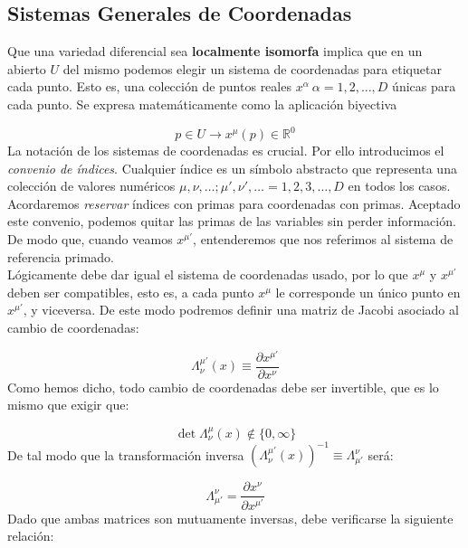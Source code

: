 \documentclass[12pt,a4paper]{book}
\numberwithin{equation}{section}
\numberwithin{figure}{section}
\newcommand{\parciales}[2]{\frac{\partial #1}{\partial #2}}
\begin{document}
\subsection{Sistemas Generales de Coordenadas}

Que una variedad diferencial sea \textbf{localmente isomorfa} implica que en un abierto $U$ del mismo podemos elegir un sistema de coordenadas para etiquetar cada punto. Esto es, una colección de puntos reales $x^{\alpha} \ \alpha=1,2,...,D$ únicas para cada punto. Se expresa matemáticamente como la aplicación biyectiva 

\begin{equation}
p \in U \longrightarrow x^{\mu} (p) \in \mathbb{R}^0
\end{equation}
La notación de los sistemas de coordenadas es crucial. Por ello introducimos el \textit{convenio de índices}. Cualquier índice es un símbolo abstracto que representa una colección de valores numéricos $\mu,\nu,\ldots;\mu',\nu',\ldots = 1,2,3,\ldots,D$ en todos los casos. Acordaremos \textit{reservar} índices con primas para coordenadas con primas. Aceptado este convenio, podemos quitar las primas de las variables sin perder información. De modo que, cuando veamos $x^{\mu'}$, entenderemos que nos referimos al sistema de referencia primado. \\

Lógicamente debe dar igual el sistema de coordenadas usado, por lo que $x^{\mu}$ y $x^{\mu'}$ deben ser compatibles, esto es, a cada punto $x^{\mu}$ le corresponde un único punto en $x^{\mu'}$, y  viceversa. De este modo podremos definir una matriz de Jacobi asociado al cambio de coordenadas:

\begin{equation}
\Lambda_{\nu}^{\mu'} (x) \equiv \parciales{x^{\mu'}}{x^{\nu}} 
\end{equation}
Como hemos dicho, todo cambio de coordenadas debe ser invertible, que es lo mismo que exigir que:

\begin{equation}
\det \Lambda^{\mu}_{\nu} (x) \notin \{ 0,\infty \}
\end{equation}
De tal modo que la transformación inversa $
(\Lambda_{\nu}^{\mu'} (x))^{-1} \equiv \Lambda_{\mu'}^{\nu}$  será:

\begin{equation}
\Lambda_{\mu'}^{\nu} = \parciales{x^{\nu}}{x^{\mu'}} 
\end{equation}
Dado que ambas matrices son mutuamente inversas, debe verificarse la siguiente relación:
\end{document}
